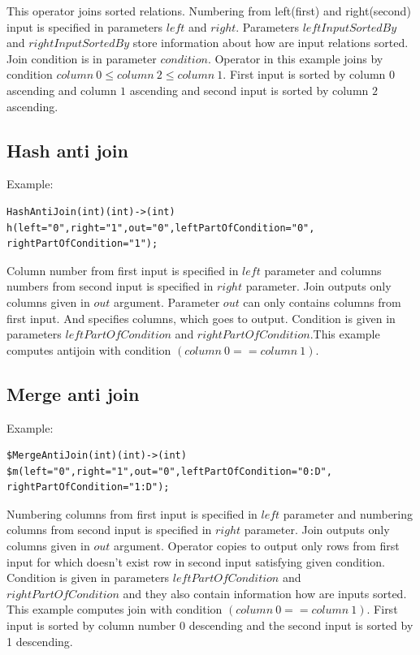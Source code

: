 This operator joins sorted relations. Numbering from left(first) and right(second) input is specified in parameters $left$ and $right$. Parameters $leftInputSortedBy$ and $rightInputSortedBy$ store information about how are input relations sorted. Join condition is in parameter $condition$. Operator in this example joins by condition $column~0 \leq column~2\leq column~1$. First input is sorted by column $0$ ascending and column $1$ ascending and second input is sorted by column $2$ ascending.

\subsection{Hash anti join}
Example:
\begin{lstlisting}
HashAntiJoin(int)(int)->(int)
h(left="0",right="1",out="0",leftPartOfCondition="0",
rightPartOfCondition="1"); 
\end{lstlisting}

Column number from first input is specified in $left$ parameter and columns numbers from second input is specified in $right$ parameter. Join outputs only columns given in $out$ argument. Parameter $out$ can only contains columns from first input. And specifies columns, which goes to output. Condition is given in parameters $leftPartOfCondition$ and $rightPartOfCondition$.This example computes antijoin with condition $(column~0==column~1)$.

\subsection{Merge anti join}
Example:
\begin{lstlisting}
$MergeAntiJoin(int)(int)->(int)
$m(left="0",right="1",out="0",leftPartOfCondition="0:D",
rightPartOfCondition="1:D");
\end{lstlisting}

Numbering columns from first input is specified in $left$ parameter and numbering columns from second input is specified in $right$ parameter. Join outputs only columns given in $out$ argument. Operator copies to output only rows from first input for which doesn't exist row in second input satisfying given condition.
Condition is given in parameters $leftPartOfCondition$ and $rightPartOfCondition$ and they also contain information how are inputs sorted. This example computes join with condition $(column~0==column~1)$. First input is sorted by column number 0 descending and the second input is sorted by 1 descending.

